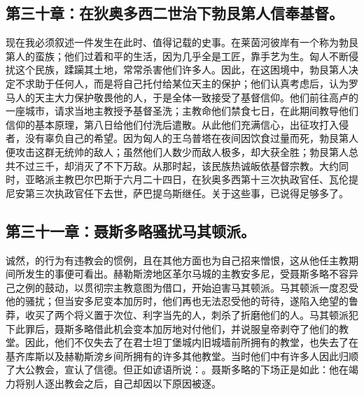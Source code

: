 
\subsection{第三十章：在狄奥多西二世治下勃艮第人信奉基督。}

现在我必须叙述一件发生在此时、值得记载的史事。在莱茵河彼岸有一个称为勃艮第人的蛮族；他们过着和平的生活，因为几乎全是工匠，靠手艺为生。匈人不断侵扰这个民族，蹂躏其土地，常常杀害他们许多人。因此，在这困境中，勃艮第人决定不求助于任何人，而是将自己托付给某位天主的保护；他们认真考虑后，认为罗马人的天主大力保护敬畏他的人，于是全体一致接受了基督信仰。他们前往高卢的一座城市，请求当地主教授予基督圣洗；主教命他们禁食七日，在此期间教导他们信仰的基本原理，第八日给他们付洗后遣散。从此他们充满信心，出征攻打入侵者，没有辜负自己的希望。因为匈人的王乌普塔在夜间因饮食过量而死，勃艮第人便攻击这群无统帅的敌人；虽然他们人数少而敌人极多，却大获全胜；勃艮第人总共不过三千，却消灭了不下万敌。从那时起，该民族热诚皈依基督宗教。大约同时，亚略派主教巴尔巴斯于六月二十四日，在狄奥多西第十三次执政官任、瓦伦提尼安第三次执政官任下去世，萨巴提乌斯继任。关于这些事，已说得足够多了。\par


\subsection{第三十一章：聂斯多略骚扰马其顿派。}

诚然，的行为有违教会的惯例，且在其他方面也为自己招来憎恨，这从他任主教期间所发生的事便可看出。赫勒斯滂地区革尔马城的主教安多尼，受聂斯多略不容异己之例的鼓动，以贯彻宗主教意图为借口，开始迫害马其顿派。马其顿派一度忍受他的骚扰；但当安多尼变本加厉时，他们再也无法忍受他的苛待，遂陷入绝望的鲁莽，收买了两个将义置于次位、利字当先的人，刺杀了折磨他们的人。马其顿派犯下此罪后，聂斯多略借此机会变本加厉地对付他们，并说服皇帝剥夺了他们的教堂。因此，他们不仅失去了在君士坦丁堡城内旧城墙前所拥有的教堂，也失去了在基齐库斯以及赫勒斯滂乡间所拥有的许多其他教堂。当时他们中有许多人因此归顺了大公教会，宣认了信德。但正如谚语所说：。聂斯多略的下场正是如此：他在竭力将别人逐出教会之后，自己却因以下原因被逐。\par


